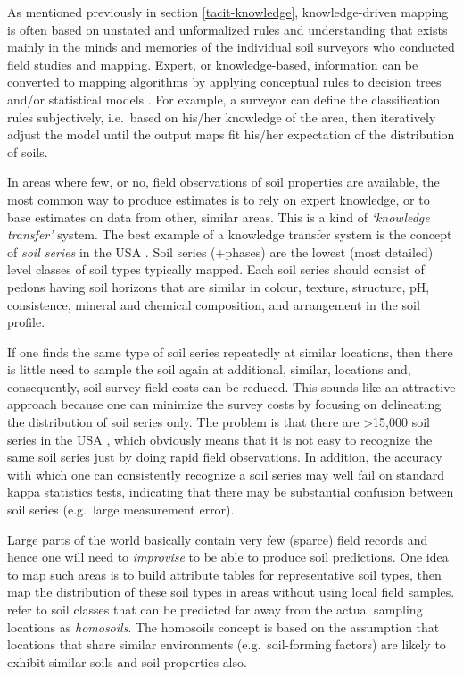 \documentclass[graybox,natbib,nospthms,UStrade]{svmono}
\begin{document}
As mentioned previously in section \ref{tacit-knowledge}, knowledge-driven
mapping is often based on unstated and unformalized rules and
understanding that exists mainly in the minds and memories of the
individual soil surveyors who conducted field studies and mapping.
Expert, or knowledge-based, information can be converted to mapping
algorithms by applying conceptual rules to decision trees and/or
statistical models \citep{MacMillan2005CJSS, Walter2006DSS, Liu2009}.
For example, a surveyor can define the classification rules
subjectively, i.e.~based on his/her knowledge of the area, then
iteratively adjust the model until the output maps fit his/her
expectation of the distribution of soils.

In areas where few, or no, field observations of soil properties are
available, the most common way to produce estimates is to rely on expert
knowledge, or to base estimates on data from other, similar areas. This
is a kind of \emph{`knowledge transfer'} system. The best example of a knowledge
transfer system is the concept of \emph{soil series} in the USA
\citep{Simonson1968AA}. Soil series (+phases) are the lowest (most detailed) level classes of
soil types typically mapped. Each soil series should consist of pedons
having soil horizons that are similar in colour, texture, structure, pH,
consistence, mineral and chemical composition, and arrangement in the
soil profile.

If one finds the same type of soil series repeatedly at similar
locations, then there is little need to sample the soil again at additional,
similar, locations and, consequently, soil survey field costs can be
reduced. This sounds like an attractive approach because one can
minimize the survey costs by focusing on delineating the distribution of
soil series only. The problem is that there are \textgreater{}15,000 soil series in the
USA \citep{Smith1986SMSS}, which obviously means that it is not easy to
recognize the same soil series just by doing rapid field observations.
In addition, the accuracy with which one can consistently recognize a soil series may
well fail on standard kappa statistics tests, indicating that there may
be substantial confusion between soil series (e.g.~large measurement
error).

Large parts of the world basically contain very few (sparce) field records and hence
one will need to \emph{improvise} to be able to produce soil predictions. One
idea to map such areas is to build attribute tables for representative
soil types, then map the distribution of these soil types in areas
without using local field samples. \citet{Mallavan2010PSS} refer to soil
classes that can be predicted far away from the actual sampling
locations as \emph{homosoils}. The homosoils concept is based on the
assumption that locations that share similar environments (e.g.~soil-forming factors) are
likely to exhibit similar soils and soil properties also.
\end{document}
